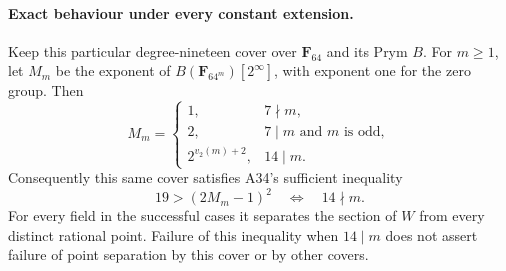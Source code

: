 \paragraph{Exact behaviour under every constant extension.}
Keep this particular degree-nineteen cover over $\mathbf F_{64}$
and its Prym $B$.  For $m\geq1$, let $M_m$ be the exponent of
$B(\mathbf F_{64^m})[2^\infty]$, with exponent one for the zero
group.  Then
\[
 M_m=
 \begin{cases}
  1,&7\nmid m,\\
  2,&7\mid m\text{ and }m\text{ is odd},\\
  2^{v_2(m)+2},&14\mid m.
 \end{cases}                                                   \tag{BE.22}
\]
Consequently this same cover satisfies A34's sufficient inequality
\[
                    19>(2M_m-1)^2
                    \quad\Longleftrightarrow\quad14\nmid m.   \tag{BE.23}
\]
For every field in the successful cases it separates the section
of $W$ from every distinct rational point.  Failure of this
inequality when $14\mid m$ does not assert failure of point
separation by this cover or by other covers.

